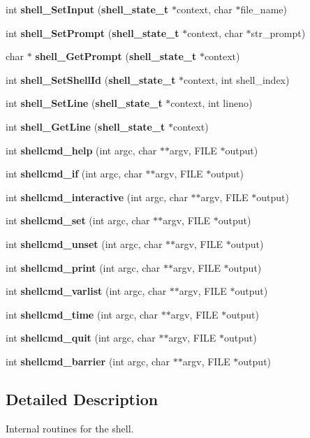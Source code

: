 \begin{CompactItemize}
\item 
int {\bf shell\_\-Set\-Input} ({\bf shell\_\-state\_\-t} $\ast$context, char $\ast$file\_\-name)
\item 
int {\bf shell\_\-Set\-Prompt} ({\bf shell\_\-state\_\-t} $\ast$context, char $\ast$str\_\-prompt)
\item 
char $\ast$ {\bf shell\_\-Get\-Prompt} ({\bf shell\_\-state\_\-t} $\ast$context)
\item 
int {\bf shell\_\-Set\-Shell\-Id} ({\bf shell\_\-state\_\-t} $\ast$context, int shell\_\-index)
\item 
int {\bf shell\_\-Set\-Line} ({\bf shell\_\-state\_\-t} $\ast$context, int lineno)
\item 
int {\bf shell\_\-Get\-Line} ({\bf shell\_\-state\_\-t} $\ast$context)
\item 
int {\bf shellcmd\_\-help} (int argc, char $\ast$$\ast$argv, FILE $\ast$output)
\item 
int {\bf shellcmd\_\-if} (int argc, char $\ast$$\ast$argv, FILE $\ast$output)
\item 
int {\bf shellcmd\_\-interactive} (int argc, char $\ast$$\ast$argv, FILE $\ast$output)
\item 
int {\bf shellcmd\_\-set} (int argc, char $\ast$$\ast$argv, FILE $\ast$output)
\item 
int {\bf shellcmd\_\-unset} (int argc, char $\ast$$\ast$argv, FILE $\ast$output)
\item 
int {\bf shellcmd\_\-print} (int argc, char $\ast$$\ast$argv, FILE $\ast$output)
\item 
int {\bf shellcmd\_\-varlist} (int argc, char $\ast$$\ast$argv, FILE $\ast$output)
\item 
int {\bf shellcmd\_\-time} (int argc, char $\ast$$\ast$argv, FILE $\ast$output)
\item 
int {\bf shellcmd\_\-quit} (int argc, char $\ast$$\ast$argv, FILE $\ast$output)
\item 
int {\bf shellcmd\_\-barrier} (int argc, char $\ast$$\ast$argv, FILE $\ast$output)
\end{CompactItemize}


\subsection{Detailed Description}
Internal routines for the shell. 

